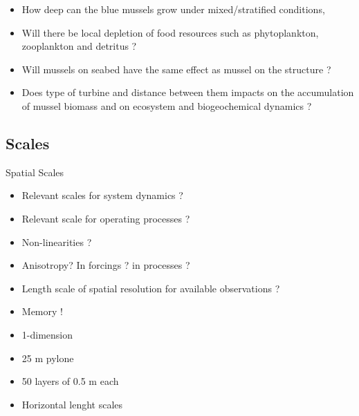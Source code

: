 \documentclass[final,xcolor=dvipsnames]{beamer}
\begin{document}
\begin{frame}
\begin{exampleblock}{}
\begin{itemize}
    \item How deep can the blue mussels grow under mixed/stratified conditions,
    \item Will there be local depletion of food resources such as phytoplankton, zooplankton and detritus ?
    \item Will mussels on seabed have the same effect as mussel on the structure ? 
    \item Does type of turbine and distance between them impacts on the accumulation of mussel biomass and on ecosystem and biogeochemical dynamics ?
\end{itemize}
\end{exampleblock}
\end{frame}

\subsection{Scales}
\begin{frame}
\begin{block}{Spatial Scales}
\begin{itemize}[<+->]
    \item Relevant scales for system dynamics ?
    \item Relevant scale for operating processes ?
    \item Non-linearities ?
    \item Anisotropy? In forcings ? in processes ?
    \item Length scale of spatial resolution for available observations ?
    \item Memory ! 
\end{itemize}
\end{block}

\pause

\begin{exampleblock}{}
\begin{itemize}
    \item 1-dimension
    \item 25 m pylone
    \item 50 layers of 0.5 m each
    \item Horizontal lenght scales
\end{itemize} 
\end{exampleblock}

\end{frame}
\end{document}
